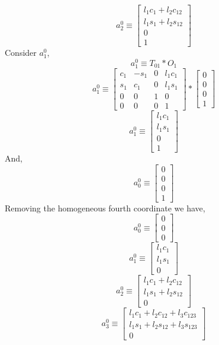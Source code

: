 \documentclass[12pt]{article}
\begin{document}
\[
  a_2^0 \equiv
  \begin{bmatrix}
    l_1c_1 + l_2c_{12}\\
    l_1s_1 + l_2s_{12}\\
    0 \\
    1
  \end{bmatrix}
\]
Consider $a_{1}^{0}$,
\[
  a_1^0 \equiv T_{01} * O_1
\]
\[
  a_1^0 \equiv
  \begin{bmatrix} c_1 & -s_1 & 0 & l_1c_1 \\ s_1 & c_1 & 0 & l_1s_1 \\ 0 & 0 & 1 & 0 \\ 0 & 0 & 0 & 1 \end{bmatrix}
  *
  \begin{bmatrix} 0 \\ 0 \\ 0 \\ 1 \end{bmatrix}
\]
\[
  a_1^0 \equiv
  \begin{bmatrix}
    l_1c_1\\
    l_1s_1\\
    0 \\
    1
  \end{bmatrix}
\]
And,
\[
  a_0^0 \equiv \begin{bmatrix} 0 \\ 0 \\ 0 \\ 1 \end{bmatrix}
\]
Removing the homogeneous fourth coordinate we have,
\[
  a_0^0 \equiv
  \begin{bmatrix} 0 \\ 0 \\ 0  \end{bmatrix}
\]
\[
  a_1^0 \equiv
  \begin{bmatrix}
    l_1c_1\\
    l_1s_1\\
    0
  \end{bmatrix}
\]
\[
  a_2^0 \equiv
  \begin{bmatrix}
    l_1c_1 + l_2c_{12}\\
    l_1s_1 + l_2s_{12}\\
    0
  \end{bmatrix}
\]
\[
  a_3^0 \equiv
  \begin{bmatrix}
    l_1c_1 + l_2c_{12} + l_3c_{123}\\
    l_1s_1 + l_2s_{12} + l_3s_{123}\\
    0
  \end{bmatrix}
\]
\end{document}
